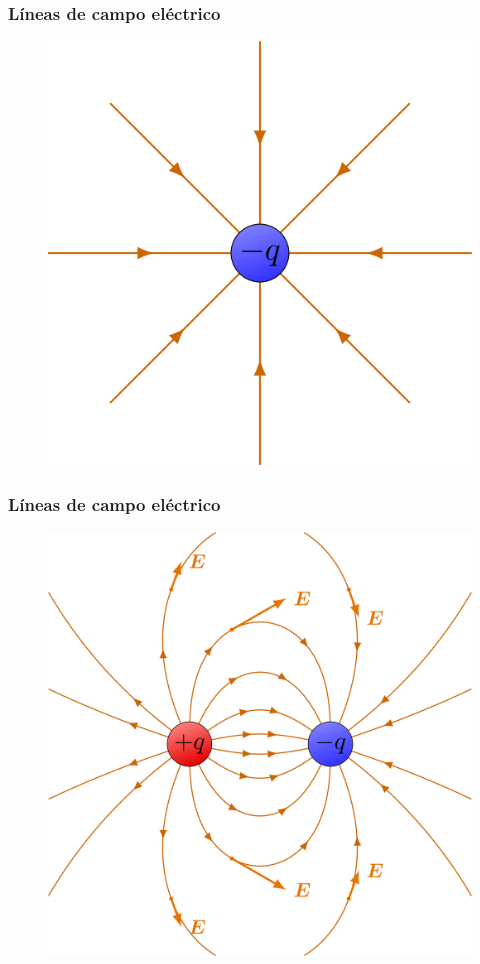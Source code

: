 \documentclass[14pt]{beamer}
\begin{document}
\begin{frame}
\frametitle{Líneas de campo eléctrico}
\begin{figure}
    \centering
    \includegraphics[scale=0.15]{Imagenes/Campo_Electrico_02.png}
\end{figure}
\end{frame}
\begin{frame}
\frametitle{Líneas de campo eléctrico}
\begin{figure}
    \centering
    \includegraphics[scale=0.1]{Imagenes/Campo_Electrico_03.png}
\end{figure}
\end{frame}
\end{document}
